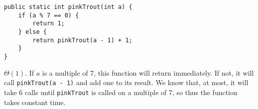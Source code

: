 \begin{blocksection}
\question

\begin{lstlisting}
public static int pinkTrout(int a) {
    if (a % 7 == 0) {
        return 1;
    } else {
        return pinkTrout(a - 1) + 1;
    }
}
\end{lstlisting}

\begin{solution}
$\Theta(1)$. If $a$ is a multiple of 7, this function will return immediately.
If not, it will call \lstinline$pinkTrout(a - 1)$ and add one to its result. We
know that, at most, it will take 6 calls until \lstinline$pinkTrout$ is called
on a multiple of 7, so thus the function takes constant time.
\end{solution}
\end{blocksection}
